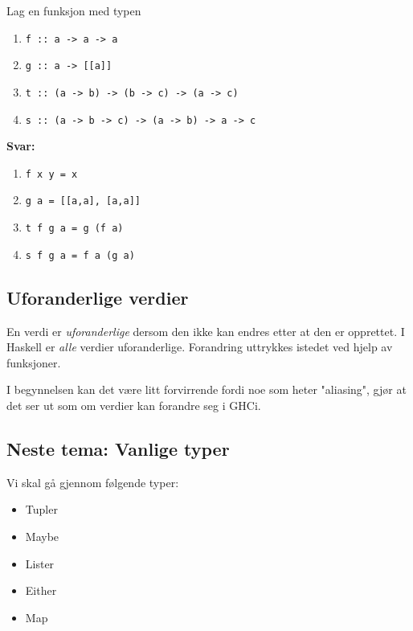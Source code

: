 \documentclass{article}
\begin{document}
\begin{ex}
    Lag en funksjon med typen

    \begin{enumerate}
        \item \texttt{f :: a -> a -> a}
        \item \texttt{g :: a -> [[a]]}
        \item \texttt{t :: (a -> b) -> (b -> c) -> (a -> c)}
        \item \texttt{s :: (a -> b -> c) -> (a -> b) -> a -> c}
    \end{enumerate}

    \textbf{Svar:}

    \begin{enumerate}
        \item \texttt{f x y = x} 
        \item \texttt{g a = [[a,a], [a,a]]}
        \item \texttt{t f g a = g (f a)}
        \item \texttt{s f g a = f a (g a)}
    \end{enumerate}
\end{ex}

\subsection{Uforanderlige verdier}
En verdi er \textit{uforanderlige} dersom den ikke kan endres etter at den er opprettet. I Haskell er \textit{alle} verdier uforanderlige. Forandring uttrykkes istedet ved hjelp av funksjoner.
\bigskip

 I begynnelsen kan det være litt forvirrende fordi noe som heter "aliasing", gjør at det ser ut som om verdier kan forandre seg i GHCi.

\subsection{Neste tema: Vanlige typer}

Vi skal gå gjennom følgende typer:

\begin{itemize}
    \item Tupler
    \item Maybe
    \item Lister
    \item Either
    \item Map
\end{itemize}
\end{document}
